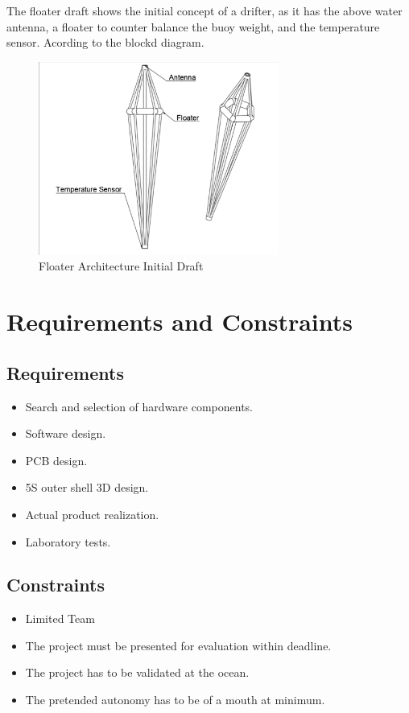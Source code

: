The floater draft shows the initial concept of a drifter, as it has the above water antenna, a floater to counter balance the buoy weight, and the temperature sensor. Acording to the blockd diagram.
\begin{figure}[H]
    \centering
    \includegraphics[width=0.7\textwidth]{images/diagrams/shell/unnamed.png}  %
    \caption{Floater Architecture Initial Draft}
    \label{fig:Floater Architecture Initial Draft}        
\end{figure}

\section{Requirements and Constraints}
\subsection{Requirements}
\begin{itemize}
    \item Search and selection of hardware components.
    \item Software design.
    \item PCB design.
    \item 5S outer shell 3D design.
    \item Actual product realization.
    \item Laboratory tests.
\end{itemize}
\subsection{Constraints}
\begin{itemize}
    \item Limited Team
    \item The project must be presented for evaluation within deadline.
    \item The project has to be validated at the ocean.
    \item The pretended autonomy has to be of a mouth at minimum.
\end{itemize}

